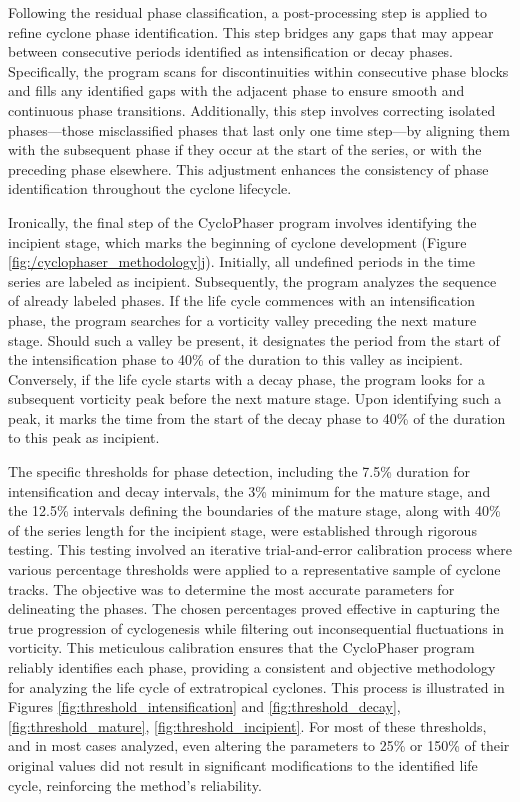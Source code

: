 Following the residual phase classification, a post-processing step is applied to refine cyclone phase identification. This step bridges any gaps that may appear between consecutive periods identified as intensification or decay phases. Specifically, the program scans for discontinuities within consecutive phase blocks and fills any identified gaps with the adjacent phase to ensure smooth and continuous phase transitions. Additionally, this step involves correcting isolated phases—those misclassified phases that last only one time step—by aligning them with the subsequent phase if they occur at the start of the series, or with the preceding phase elsewhere. This adjustment enhances the consistency of phase identification throughout the cyclone lifecycle.

Ironically, the final step of the CycloPhaser program involves identifying the incipient stage, which marks the beginning of cyclone development (Figure \ref{fig:/cyclophaser_methodology}j). Initially, all undefined periods in the time series are labeled as incipient. Subsequently, the program analyzes the sequence of already labeled phases. If the life cycle commences with an intensification phase, the program searches for a vorticity valley preceding the next mature stage. Should such a valley be present, it designates the period from the start of the intensification phase to 40\% of the duration to this valley as incipient. Conversely, if the life cycle starts with a decay phase, the program looks for a subsequent vorticity peak before the next mature stage. Upon identifying such a peak, it marks the time from the start of the decay phase to 40\% of the duration to this peak as incipient.

The specific thresholds for phase detection, including the 7.5\% duration for intensification and decay intervals, the 3\% minimum for the mature stage, and the 12.5\% intervals defining the boundaries of the mature stage, along with 40\% of the series length for the incipient stage, were established through rigorous testing. This testing involved an iterative trial-and-error calibration process where various percentage thresholds were applied to a representative sample of cyclone tracks. The objective was to determine the most accurate parameters for delineating the phases. The chosen percentages proved effective in capturing the true progression of cyclogenesis while filtering out inconsequential fluctuations in vorticity. This meticulous calibration ensures that the CycloPhaser program reliably identifies each phase, providing a consistent and objective methodology for analyzing the life cycle of extratropical cyclones. This process is illustrated in Figures \ref{fig:threshold_intensification} and \ref{fig:threshold_decay}, \ref{fig:threshold_mature}, \ref{fig:threshold_incipient}. For most of these thresholds, and in most cases analyzed, even altering the parameters to 25\% or 150\% of their original values did not result in significant modifications to the identified life cycle, reinforcing the method's reliability.


